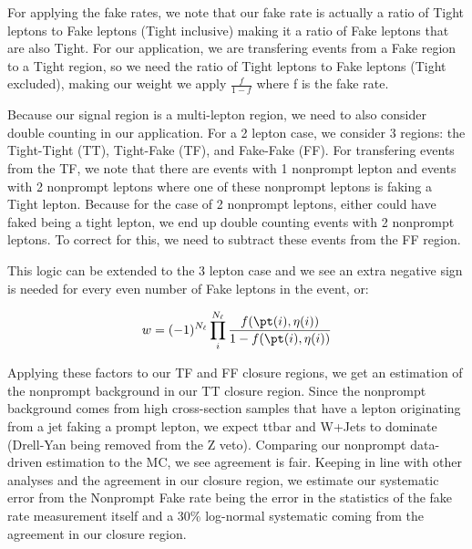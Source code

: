 For applying the fake rates, we note that our fake rate is actually a ratio of Tight leptons to Fake leptons (Tight inclusive) making it a ratio of Fake leptons that are also Tight. For our application, we are transfering events from a Fake region to a Tight region, so we need the ratio of Tight leptons to Fake leptons (Tight excluded), making our weight we apply $\frac{f}{1-f}$ where f is the fake rate.

Because our signal region is a multi-lepton region, we need to also consider double counting in our application. For a 2 lepton case, we consider 3 regions: the Tight-Tight (TT), Tight-Fake (TF), and Fake-Fake (FF). For transfering events from the TF, we note that there are events with 1 nonprompt lepton and events with 2 nonprompt leptons where one of these nonprompt leptons is faking a Tight lepton. Because for the case of 2 nonprompt leptons, either could have faked being a tight lepton, we end up double counting events with 2 nonprompt leptons. To correct for this, we need to subtract these events from the FF region.

This logic can be extended to the 3 lepton case and we see an extra negative sign is needed for every even number of Fake leptons in the event, or:

\begin{equation}
  \label{eq:1}
  w = (-1)^{N_{\ell}}\prod_{i}^{N_{\ell}}\frac{f(\pt(i), \eta(i))}{1-f(\pt(i), \eta(i))}
\end{equation}

Applying these factors to our TF and FF closure regions, we get an estimation of the nonprompt background in our TT closure region. Since the nonprompt background comes from high cross-section samples that have a lepton originating from a jet faking a prompt lepton, we expect ttbar and W+Jets to dominate (Drell-Yan being removed from the Z veto). Comparing our nonprompt data-driven estimation to the MC, we see agreement is fair. Keeping in line with other analyses and the agreement in our closure region, we estimate our systematic error from the Nonprompt Fake rate being the error in the statistics of the fake rate measurement itself and a 30\% log-normal systematic coming from the agreement in our closure region.

